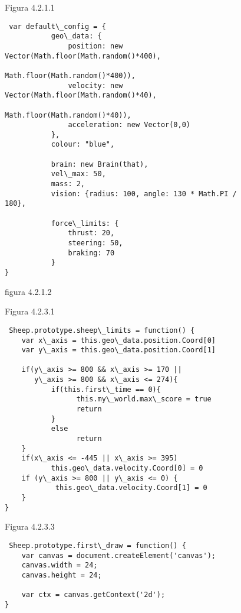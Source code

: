 \begin{figure}[bp]
Figura 4.2.1.1 
\begin{verbatim}
 var default\_config = {
           geo\_data: {
               position: new Vector(Math.floor(Math.random()*400), 
                                    Math.floor(Math.random()*400)),
               velocity: new Vector(Math.floor(Math.random()*40),
                                    Math.floor(Math.random()*40)),
               acceleration: new Vector(0,0)
           },
           colour: "blue",

           brain: new Brain(that),
           vel\_max: 50,
           mass: 2,
           vision: {radius: 100, angle: 130 * Math.PI / 180},

           force\_limits: {
               thrust: 20,
               steering: 50,
               braking: 70
           }
}
\end{verbatim}
figura 4.2.1.2
\end{figure}


\begin{figure}[p]
Figura 4.2.3.1
\begin{verbatim}
 Sheep.prototype.sheep\_limits = function() {
    var x\_axis = this.geo\_data.position.Coord[0]
    var y\_axis = this.geo\_data.position.Coord[1]

    if(y\_axis >= 800 && x\_axis >= 170 || 
       y\_axis >= 800 && x\_axis <= 274){
           if(this.first\_time == 0){
                 this.my\_world.max\_score = true
                 return
           }
           else
                 return
    }
    if(x\_axis <= -445 || x\_axis >= 395)
           this.geo\_data.velocity.Coord[0] = 0
    if (y\_axis >= 800 || y\_axis <= 0) {
            this.geo\_data.velocity.Coord[1] = 0
    }
}
\end{verbatim}
\end{figure}


\begin{figure}[p]
Figura 4.2.3.3
\begin{verbatim}
 Sheep.prototype.first\_draw = function() {
    var canvas = document.createElement('canvas');
    canvas.width = 24;
    canvas.height = 24;

    var ctx = canvas.getContext('2d');
}
\end{verbatim}
\end{figure}


